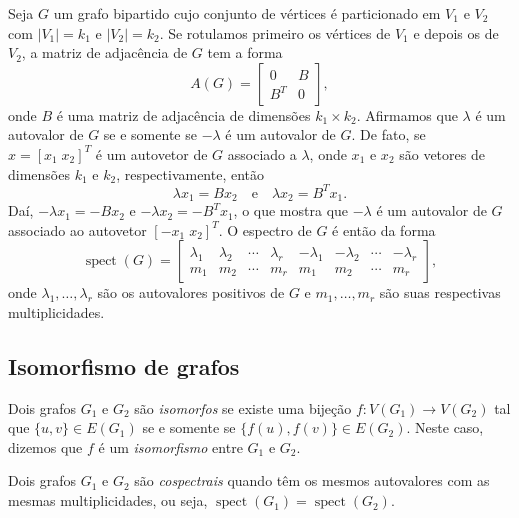 \documentclass{article}
\DeclareMathOperator{\spect}{spect}
\begin{document}
\begin{exmp}
    Seja \(G\) um grafo bipartido cujo conjunto de vértices é particionado em \(V_1\) e \(V_2\) com \(|V_1| = k_1\) e \(|V_2| = k_2\). Se rotulamos primeiro os vértices de \(V_1\) e depois os de \(V_2\), a matriz de adjacência de \(G\) tem a forma
\[
    A(G) = \begin{bmatrix}
        0 & B \\
        B^T & 0
    \end{bmatrix},
\] onde \(B\) é uma matriz de adjacência de dimensões \(k_1 \times k_2\). Afirmamos que \(\lambda\) é um autovalor de \(G\) se e somente se \(-\lambda\) é um autovalor de \(G\). De fato, se \(x = [x_1 \; x_2]^T\) é um autovetor de \(G\) associado a \(\lambda\), onde \(x_1\) e \(x_2\) são vetores de dimensões \(k_1\) e \(k_2\), respectivamente, então
\[
    \lambda x_1 = Bx_2 \quad \text{e} \quad \lambda x_2 = B^T x_1.
\] Daí, \(-\lambda x_1 = -Bx_2\) e \(-\lambda x_2 = -B^T x_1\), o que mostra que \(-\lambda\) é um autovalor de \(G\) associado ao autovetor \([-x_1 \; x_2]^T\). O espectro de \(G\) é então da forma
\[
    \spect(G) = \begin{bmatrix}
        \lambda_1 & \lambda_2 & \cdots & \lambda_r & -\lambda_1 & -\lambda_2 & \cdots & -\lambda_r \\
        m_1 & m_2 & \cdots & m_r & m_1 & m_2 & \cdots & m_r
    \end{bmatrix},
\] onde \(\lambda_1, \ldots, \lambda_r\) são os autovalores positivos de \(G\) e \(m_1, \ldots, m_r\) são suas respectivas multiplicidades.
\end{exmp}

\subsection{Isomorfismo de grafos}

\begin{defn}
    Dois grafos \(G_1\) e \(G_2\) são \emph{isomorfos} se existe uma bijeção \(f: V(G_1) \to V(G_2)\) tal que \(\{u,v\} \in E(G_1)\) se e somente se \(\{f(u), f(v)\} \in E(G_2)\). Neste caso, dizemos que \(f\) é um \emph{isomorfismo} entre \(G_1\) e \(G_2\).
\end{defn}

\begin{defn}
    Dois grafos \(G_1\) e \(G_2\) são \emph{cospectrais} quando têm os mesmos autovalores com as mesmas multiplicidades, ou seja, \(\spect(G_1) = \spect(G_2)\).
\end{defn}
\end{document}
